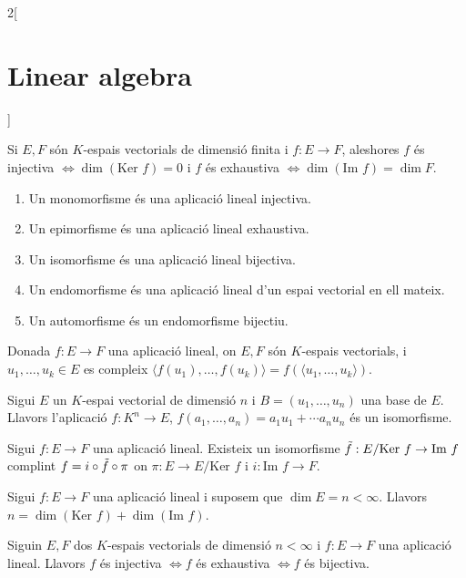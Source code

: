 \documentclass[../../../main.tex]{subfiles}
\begin{document}
\begin{multicols}{2}[\section{Linear algebra}]
\begin{prop}
\begin{enumerate}
\end{enumerate}
\end{prop}
\begin{prop}
Si $E,F$ són $K$-espais vectorials de dimensió finita i $f:E\rightarrow F$, aleshores $f$ és injectiva $\iff \dim(\text{Ker }f)=0$ i $f$ és exhaustiva $\iff \dim(\text{Im }f)=\dim F$.
\end{prop}
\begin{definition}
\hfill
\begin{enumerate}
    \item Un monomorfisme és una aplicació lineal injectiva.
    \item Un epimorfisme és una aplicació lineal exhaustiva.
    \item Un isomorfisme és una aplicació lineal bijectiva.
    \item Un endomorfisme és una aplicació lineal d'un espai vectorial en ell mateix.
    \item Un automorfisme és un endomorfisme bijectiu.
\end{enumerate}
\end{definition}
\begin{lemma}
Donada $f:E\rightarrow F$ una aplicació lineal, on $E,F$ són $K$-espais vectorials, i $u_1,\ldots,u_k\in E$ es compleix $\langle f(u_1),\ldots,f(u_k)\rangle=f(\langle u_1,\ldots,u_k\rangle)$.
\end{lemma}
\begin{theorem}
Sigui $E$ un $K$-espai vectorial  de dimensió $n$ i $B=(u_1,\ldots,u_n)$ una base de $E$. Llavors l'aplicació $f:K^n\rightarrow E$, $f(a_1,\ldots,a_n)=a_1u_1+\cdots a_nu_n$ és un isomorfisme.
\end{theorem}
\begin{theorem}
Sigui $f:E\rightarrow F$ una aplicació lineal. Existeix un isomorfisme $\Tilde{f}:E/\text{Ker }f\rightarrow \text{Im }f$ complint $f=i\circ\Tilde{f}\circ\pi$ on $\pi:E\rightarrow E/\text{Ker }f$ i $i:\text{Im }f\rightarrow F$.
\end{theorem}
\begin{corollary}
Sigui $f:E\rightarrow F$ una aplicació lineal i suposem que $\dim E=n<\infty$. Llavors $n=\dim(\text{Ker }f)+\dim(\text{Im }f)$.
\end{corollary}
\begin{corollary}
Siguin $E,F$ dos $K$-espais vectorials de dimensió $n<\infty$ i $f:E\rightarrow F$ una aplicació lineal. Llavors $f$ és injectiva $\iff f$ és exhaustiva $\iff f$ és bijectiva.

\end{corollary}
\end{multicols}
\end{document}
